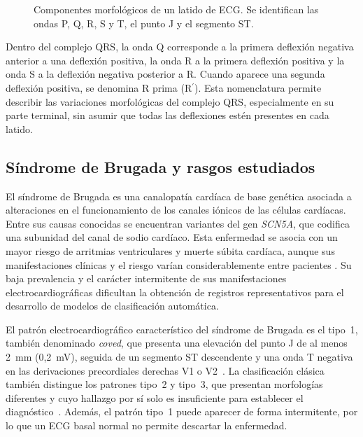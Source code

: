 \begin{figure}[H]
  \centering
  \caption{Componentes morfológicos de un latido de ECG. Se identifican las ondas P, Q, R, S y T, el punto J y el segmento ST.}
  \label{fig:morfologia_ecg}
\end{figure}

Dentro del complejo QRS, la onda Q corresponde a la primera deflexión negativa anterior a una deflexión positiva, la onda R a la primera deflexión positiva y la onda S a la deflexión negativa posterior a R. Cuando aparece una segunda deflexión positiva, se denomina R prima (R$^\prime$). Esta nomenclatura permite describir las variaciones morfológicas del complejo QRS, especialmente en su parte terminal, sin asumir que todas las deflexiones estén presentes en cada latido.

\subsection{Síndrome de Brugada y rasgos estudiados}
\label{sec:brugada_clinica}

El síndrome de Brugada es una canalopatía cardíaca de base genética asociada a alteraciones en el funcionamiento de los canales iónicos de las células cardíacas. Entre sus causas conocidas se encuentran variantes del gen \emph{SCN5A}, que codifica una subunidad del canal de sodio cardíaco. Esta enfermedad se asocia con un mayor riesgo de arritmias ventriculares y muerte súbita cardíaca, aunque sus manifestaciones clínicas y el riesgo varían considerablemente entre pacientes \cite{zeppenfeld2022,wilde2023scbt}. Su baja prevalencia y el carácter intermitente de sus manifestaciones electrocardiográficas dificultan la obtención de registros representativos para el desarrollo de modelos de clasificación automática.

El patrón electrocardiográfico característico del síndrome de Brugada es el tipo~1, también denominado \emph{coved}, que presenta una elevación del punto J de al menos 2~mm (0,2~mV), seguida de un segmento ST descendente y una onda T negativa en las derivaciones precordiales derechas V1 o V2~\cite{zeppenfeld2022}. La clasificación clásica también distingue los patrones tipo~2 y tipo~3, que presentan morfologías diferentes y cuyo hallazgo por sí solo es insuficiente para establecer el diagnóstico~\cite{napolitano2006,wilde2023scbt}. Además, el patrón tipo~1 puede aparecer de forma intermitente, por lo que un ECG basal normal no permite descartar la enfermedad.


